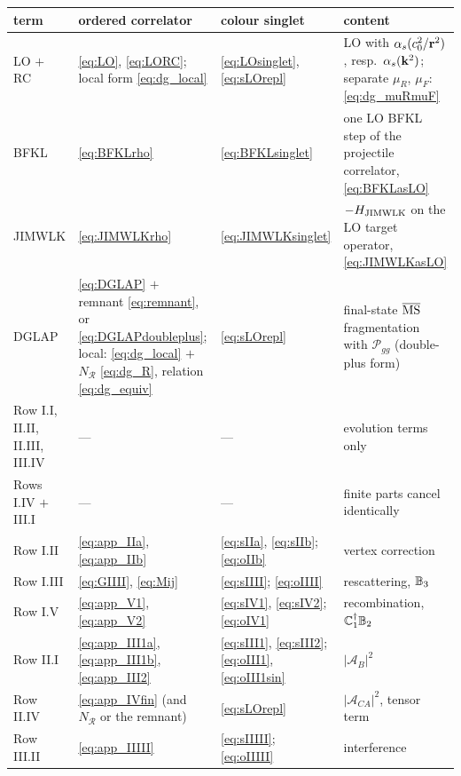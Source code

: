 \begin{center}
\renewcommand{\arraystretch}{1.18}
\footnotesize\setlength{\tabcolsep}{3pt}
\begin{tabular}{@{}>{\raggedright\arraybackslash}p{}>{\raggedright\arraybackslash}p{}>{\raggedright\arraybackslash}p{}>{\raggedright\arraybackslash}p{}@{}}
\toprule
term & ordered correlator & colour singlet & content\\
\midrule
LO $+$ RC & \eqref{eq:LO}, \eqref{eq:LORC}; local form \eqref{eq:dg_local} & \eqref{eq:LOsinglet}, \eqref{eq:sLOrepl} & LO with $\alpha_s(c_0^2/\mathbf{r}^2)$, resp.\ $\alpha_s(\mathbf{k}^2)$; separate $\mu_R$, $\mu_F$: \eqref{eq:dg_muRmuF}\\
BFKL & \eqref{eq:BFKLrho} & \eqref{eq:BFKLsinglet} & one LO BFKL step of the projectile correlator, \eqref{eq:BFKLasLO}\\
JIMWLK & \eqref{eq:JIMWLKrho} & \eqref{eq:JIMWLKsinglet} & $-H_{\rm JIMWLK}$ on the LO target operator, \eqref{eq:JIMWLKasLO}\\
DGLAP & \eqref{eq:DGLAP} $+$ remnant \eqref{eq:remnant}, or \eqref{eq:DGLAPdoubleplus}; local: \eqref{eq:dg_local} $+$ $N_{\mathcal R}$ \eqref{eq:dg_R}, relation \eqref{eq:dg_equiv} & \eqref{eq:sLOrepl} & final-state $\overline{\rm MS}$ fragmentation with $\mathcal P_{gg}$ (double-plus form)\\
\midrule
Row I.I, II.II, II.III, III.IV & --- & --- & evolution terms only\\
Rows I.IV $+$ III.I & --- & --- & finite parts cancel identically\\
Row I.II & \eqref{eq:app_IIa}, \eqref{eq:app_IIb} & \eqref{eq:sIIa}, \eqref{eq:sIIb}; \eqref{eq:oIIb} & vertex correction\\
Row I.III & \eqref{eq:GIIII}, \eqref{eq:Mij} & \eqref{eq:sIIII}; \eqref{eq:oIIII} & rescattering, $\mathbb{B}_3$\\
Row I.V & \eqref{eq:app_V1}, \eqref{eq:app_V2} & \eqref{eq:sIV1}, \eqref{eq:sIV2}; \eqref{eq:oIV1} & recombination, $\mathbb{C}_1^\dagger\mathbb{B}_2$\\
Row II.I & \eqref{eq:app_III1a}, \eqref{eq:app_III1b}, \eqref{eq:app_III2} & \eqref{eq:sIII1}, \eqref{eq:sIII2}; \eqref{eq:oIII1}, \eqref{eq:oIII1sin} & $|\mathcal A_B|^2$\\
Row II.IV & \eqref{eq:app_IVfin} (and $N_{\mathcal R}$ or the remnant) & \eqref{eq:sLOrepl} & $|\mathcal A_{CA}|^2$, tensor term\\
Row III.II & \eqref{eq:app_IIIII} & \eqref{eq:sIIIII}; \eqref{eq:oIIIII} & interference\\

\end{tabular}
\end{center}
